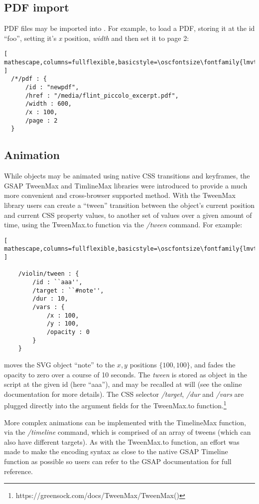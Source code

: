 \subsection{PDF import}\label{sec:pdf}
PDF files may be imported into \drawsocket.
For example, to load a PDF, storing it at the \drawsocket id ``foo'', setting it's \textit{x} position, \textit{width} and then set it to page 2:

\begin{lstlisting}[ mathescape,columns=fullflexible,basicstyle=\oscfontsize\fontfamily{lmvtt}\selectfont ]
  /*/pdf : {
      /id : "newpdf",
      /href : "/media/flint_piccolo_excerpt.pdf",
      /width : 600,
      /x : 100,
      /page : 2
  }
 \end{lstlisting}


\subsection{Animation}\label{sec:animation}
While \drawsocket objects may be animated using native CSS transitions and keyframes, the GSAP TweenMax and TimlineMax libraries were introduced to provide a much more convenient and cross-browser supported method.
With the TweenMax library users can create a ``tween'' transition between the object's current position and current CSS property values, to another set of values over a given amount of time, using the TweenMax.to function via the \textit{/tween} \drawsocket command. For example:
\begin{lstlisting}[ mathescape,columns=fullflexible,basicstyle=\oscfontsize\fontfamily{lmvtt}\selectfont ]

    /violin/tween : {
        /id : ``aaa'',
        /target : ``#note'', 
        /dur : 10,
        /vars : {
            /x : 100,
            /y : 100,
            /opacity : 0
        }
    }
 \end{lstlisting}
\noindent
moves the SVG object ``note'' to the ${x,y}$ positions $\{100,100\}$, and fades the opacity to zero over a course of 10 seconds.
The \textit{tween} is stored as object in the \drawsocket script at the given id (here ``aaa''), and may be recalled at will (see the online documentation for more details).
The CSS selector \textit{/target}, \textit{/dur} and \textit{/vars} are plugged directly into the argument fields for the TweenMax.to function.\footnote{https://greensock.com/docs/TweenMax/TweenMax()}

More complex animations can be implemented with the TimelineMax function, via the \drawsocket \textit{/timeline} command, which is comprised of an array of tweens (which can also have different targets).
As with the TweenMax.to function, an effort was made to make the encoding syntax as close to the native GSAP Timeline function as possible so users can refer to the GSAP documentation for full reference.

